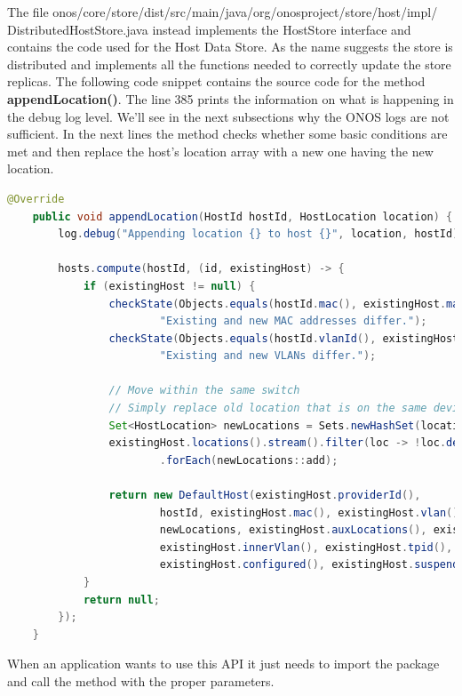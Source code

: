 The file onos/core/store/dist/src/main/java/org/onosproject/store/host/impl/\\DistributedHostStore.java instead implements the HostStore interface and contains the code used for the Host Data Store. As the name suggests the store is distributed and implements all the functions needed to correctly update the store replicas. The following code snippet contains the source code for the method \textbf{appendLocation()}. The line 385 prints the information on what is happening in the debug log level. We'll see in the next subsections why the ONOS logs are not sufficient. In the next lines the method checks whether some basic conditions are met and then replace the host's location array with a new one having the new location.
\begin{lstlisting}[language=java,firstnumber=384]
    @Override
    public void appendLocation(HostId hostId, HostLocation location) {
        log.debug("Appending location {} to host {}", location, hostId);

        hosts.compute(hostId, (id, existingHost) -> {
            if (existingHost != null) {
                checkState(Objects.equals(hostId.mac(), existingHost.mac()),
                        "Existing and new MAC addresses differ.");
                checkState(Objects.equals(hostId.vlanId(), existingHost.vlan()),
                        "Existing and new VLANs differ.");

                // Move within the same switch
                // Simply replace old location that is on the same device
                Set<HostLocation> newLocations = Sets.newHashSet(location);
                existingHost.locations().stream().filter(loc -> !loc.deviceId().equals(location.deviceId()))
                        .forEach(newLocations::add);

                return new DefaultHost(existingHost.providerId(),
                        hostId, existingHost.mac(), existingHost.vlan(),
                        newLocations, existingHost.auxLocations(), existingHost.ipAddresses(),
                        existingHost.innerVlan(), existingHost.tpid(),
                        existingHost.configured(), existingHost.suspended(), existingHost.annotations());
            }
            return null;
        });
    }
\end{lstlisting}

When an application wants to use this API it just needs to import the package and call the method with the proper parameters.

